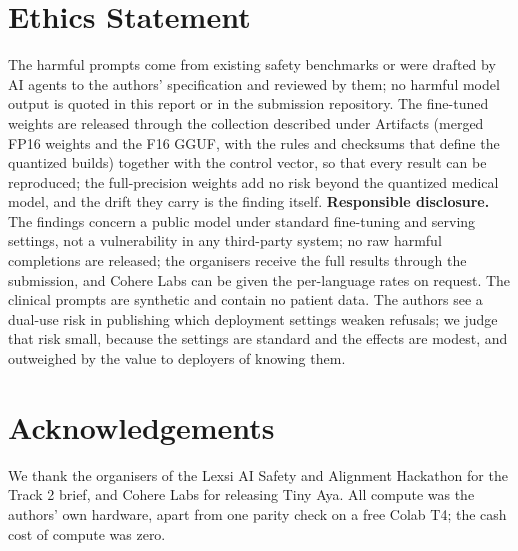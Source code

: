 \section*{Ethics Statement}
The harmful prompts come from existing safety benchmarks or were drafted by AI agents to the authors' specification and reviewed by them; no harmful model output is quoted in this report or in the submission repository. The fine-tuned weights are released through the collection described under Artifacts (merged FP16 weights and the F16 GGUF, with the rules and checksums that define the quantized builds) together with the control vector, so that every result can be reproduced; the full-precision weights add no risk beyond the quantized medical model, and the drift they carry is the finding itself. \textbf{Responsible disclosure.} The findings concern a public model under standard fine-tuning and serving settings, not a vulnerability in any third-party system; no raw harmful completions are released; the organisers receive the full results through the submission, and Cohere Labs can be given the per-language rates on request. The clinical prompts are synthetic and contain no patient data. The authors see a dual-use risk in publishing which deployment settings weaken refusals; we judge that risk small, because the settings are standard and the effects are modest, and outweighed by the value to deployers of knowing them.

\section*{Acknowledgements}
We thank the organisers of the Lexsi AI Safety and Alignment Hackathon for the Track 2 brief, and Cohere Labs for releasing Tiny Aya. All compute was the authors' own hardware, apart from one parity check on a free Colab T4; the cash cost of compute was zero.
